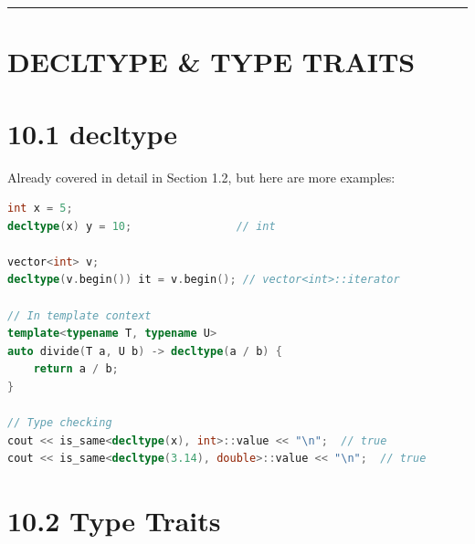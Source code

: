 \begin{center}\rule{0.5\linewidth}{0.5pt}\end{center}

\hypertarget{decltype-type-traits}{%
\section{DECLTYPE \& TYPE TRAITS}\label{decltype-type-traits}}

\hypertarget{decltype-1}{%
\section{10.1 decltype}\label{decltype-1}}

Already covered in detail in Section 1.2, but here are more examples:

\begin{lstlisting}[language={C++}]
int x = 5;
decltype(x) y = 10;                // int

vector<int> v;
decltype(v.begin()) it = v.begin(); // vector<int>::iterator

// In template context
template<typename T, typename U>
auto divide(T a, U b) -> decltype(a / b) {
    return a / b;
}

// Type checking
cout << is_same<decltype(x), int>::value << "\n";  // true
cout << is_same<decltype(3.14), double>::value << "\n";  // true
\end{lstlisting}

\hypertarget{type-traits}{%
\section{10.2 Type Traits}\label{type-traits}}

